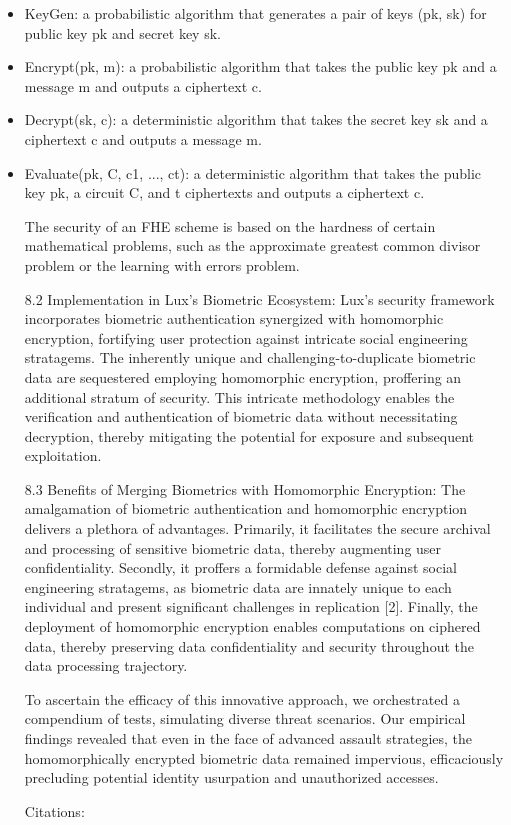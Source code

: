 \documentclass[11pt]{article}
\begin{document}
\begin{itemize}
  \item KeyGen: a probabilistic algorithm that generates a pair of keys (pk, sk) for public key pk and secret key sk.
  \item Encrypt(pk, m): a probabilistic algorithm that takes the public key pk and a message m and outputs a ciphertext c.
  \item Decrypt(sk, c): a deterministic algorithm that takes the secret key sk and a ciphertext c and outputs a message m.
  \item Evaluate(pk, C, c1, ..., ct): a deterministic algorithm that takes the public key pk, a circuit C, and t ciphertexts and outputs a ciphertext c.

The security of an FHE scheme is based on the hardness of certain mathematical problems, such as the approximate greatest common divisor problem or the learning with errors problem.


8.2 Implementation in Lux's Biometric Ecosystem: Lux's security framework incorporates biometric authentication synergized with homomorphic encryption, fortifying user protection against intricate social engineering stratagems. The inherently unique and challenging-to-duplicate biometric data are sequestered employing homomorphic encryption, proffering an additional stratum of security. This intricate methodology enables the verification and authentication of biometric data without necessitating decryption, thereby mitigating the potential for exposure and subsequent exploitation.


8.3 Benefits of Merging Biometrics with Homomorphic Encryption: The amalgamation of biometric authentication and homomorphic encryption delivers a plethora of advantages. Primarily, it facilitates the secure archival and processing of sensitive biometric data, thereby augmenting user confidentiality. Secondly, it proffers a formidable defense against social engineering stratagems, as biometric data are innately unique to each individual and present significant challenges in replication [2]. Finally, the deployment of homomorphic encryption enables computations on ciphered data, thereby preserving data confidentiality and security throughout the data processing trajectory.


To ascertain the efficacy of this innovative approach, we orchestrated a compendium of tests, simulating diverse threat scenarios. Our empirical findings revealed that even in the face of advanced assault strategies, the homomorphically encrypted biometric data remained impervious, efficaciously precluding potential identity usurpation and unauthorized accesses.


Citations:

\end{itemize}
\end{document}
